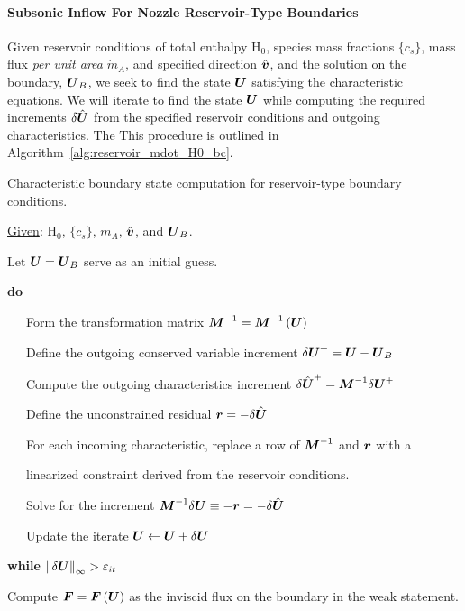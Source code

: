 \paragraph{Subsonic Inflow For Nozzle Reservoir-Type Boundaries}
Given reservoir conditions of total enthalpy H$_0$, species mass fractions $\{c_s\}$, mass flux \emph{per unit area} $\dot{m}_A$, and specified direction $\hat{\bv{v}}$, and the solution on the boundary, $\bv{U}_B$, we seek to find the state $\bv{U}$ satisfying the characteristic equations.  We will iterate to find the state $\bv{U}$ while computing the required increments $\delta{\hat{\bv{U}}}$ from the specified reservoir conditions and outgoing characteristics. The This procedure is outlined in Algorithm~\ref{alg:reservoir_mdot_H0_bc}.
\begin{algorithm}[!htb]
  \centering
  \begin{minipage}{.95\textwidth}
    \caption{Characteristic boundary state computation for reservoir-type boundary conditions.\label{alg:reservoir_mdot_H0_bc}}
    \noindent
    \sffamily
    \setcounter{alines}{1}
    \begin{list}{:\ \ }{}
        \renewcommand{\baselinestretch}{1.} \setlength{\itemsep}{-.5ex}
	\item[] \underline{Given}: H$_0$, $\{c_s\}$, $\dot{m}_A$, $\hat{\bv{v}}$, and $\bv{U}_B$.
        \item Let $\bv{U} = \bv{U}_B$ serve as an initial guess.
 	\item \textbf{do}
 	\item \ \ \ Form the transformation matrix $\bt{M}^{-1}=\bt{M}^{-1}\left(\bv{U}\right)$
 	\item \ \ \ Define the outgoing conserved variable increment $\delta{\bv{U}^{+}} = \bv{U}-\bv{U}_B$
        \item \ \ \ Compute the outgoing characteristics increment $\delta{\hat{\bv{U}}^{+}} = \bt{M}^{-1}\delta{\bv{U}^{+}}$
        \item \ \ \ Define the unconstrained residual $\bv{r} = -\delta{\hat{\bv{U}}}$
        \item \ \ \ For each incoming characteristic, replace a row of  $\bt{M}^{-1}$ and $\bv{r}$ with a 
        \item \ \ \ linearized constraint derived from the reservoir conditions.
        \item \ \ \ Solve for the increment $\bt{M}^{-1}\delta{\bv{U}} \equiv -\bv{r} =  -\delta{\hat{\bv{U}}}$
	\item \ \ \ Update the iterate  $\bv{U} \leftarrow \bv{U} + \delta{\bv{U}}$
 	\item \textbf{while} $\norm[\infty]{\delta{\bv{U}}} > \varepsilon_{it}$
        \item Compute $\bv{F}=\bv{F}\left(\bv{U}\right)$ as the inviscid flux on the boundary in the weak statement.
    \end{list}
  \end{minipage}
\end{algorithm}
